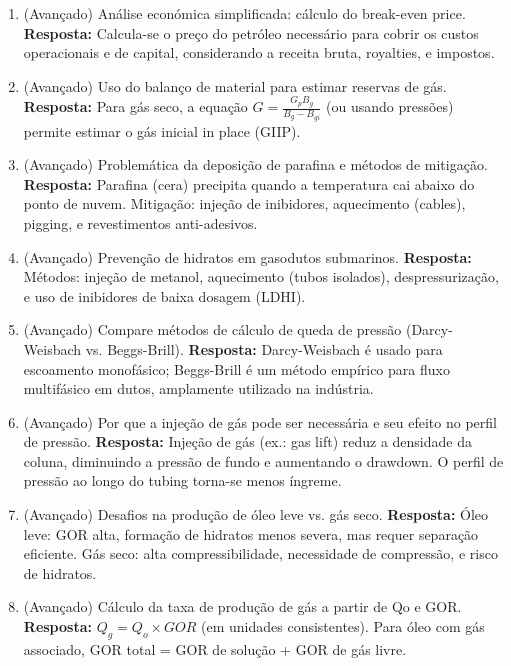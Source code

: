 \documentclass[11pt,a4paper]{article}
\begin{document}
\begin{enumerate}
  \item (Avançado) Análise económica simplificada: cálculo do break-even price.
  \textbf{Resposta:} Calcula-se o preço do petróleo necessário para cobrir os custos operacionais e de capital, considerando a receita bruta, royalties, e impostos.

  \item (Avançado) Uso do balanço de material para estimar reservas de gás.
  \textbf{Resposta:} Para gás seco, a equação $G = \frac{G_p B_g}{B_g - B_{gi}}$ (ou usando pressões) permite estimar o gás inicial in place (GIIP).

  \item (Avançado) Problemática da deposição de parafina e métodos de mitigação.
  \textbf{Resposta:} Parafina (cera) precipita quando a temperatura cai abaixo do ponto de nuvem. Mitigação: injeção de inibidores, aquecimento (cables), pigging, e revestimentos anti-adesivos.

  \item (Avançado) Prevenção de hidratos em gasodutos submarinos.
  \textbf{Resposta:} Métodos: injeção de metanol, aquecimento (tubos isolados), despressurização, e uso de inibidores de baixa dosagem (LDHI).

  \item (Avançado) Compare métodos de cálculo de queda de pressão (Darcy-Weisbach vs. Beggs-Brill).
  \textbf{Resposta:} Darcy-Weisbach é usado para escoamento monofásico; Beggs-Brill é um método empírico para fluxo multifásico em dutos, amplamente utilizado na indústria.

  \item (Avançado) Por que a injeção de gás pode ser necessária e seu efeito no perfil de pressão.
  \textbf{Resposta:} Injeção de gás (ex.: gas lift) reduz a densidade da coluna, diminuindo a pressão de fundo e aumentando o drawdown. O perfil de pressão ao longo do tubing torna-se menos íngreme.

  \item (Avançado) Desafios na produção de óleo leve vs. gás seco.
  \textbf{Resposta:} Óleo leve: GOR alta, formação de hidratos menos severa, mas requer separação eficiente. Gás seco: alta compressibilidade, necessidade de compressão, e risco de hidratos.

  \item (Avançado) Cálculo da taxa de produção de gás a partir de Qo e GOR.
  \textbf{Resposta:} $Q_g = Q_o \times GOR$ (em unidades consistentes). Para óleo com gás associado, GOR total = GOR de solução + GOR de gás livre.


\end{enumerate}
\end{document}
